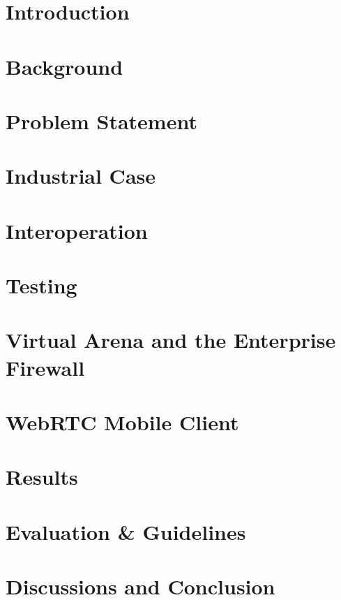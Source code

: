 \chapter{Introduction}


\chapter{Background}


\chapter{Problem Statement}


\chapter{Industrial Case}


\chapter{Interoperation}


\chapter{Testing}


\chapter{Virtual Arena and the Enterprise Firewall}


\chapter{WebRTC Mobile Client}


\chapter{Results}


\chapter{Evaluation \& Guidelines}


\chapter{Discussions and Conclusion}
